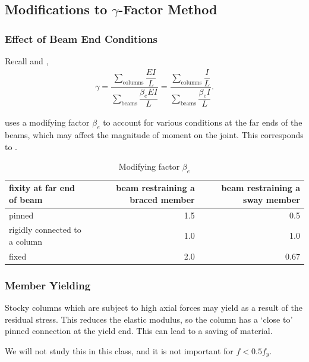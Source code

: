 \subsection{Modifications to \texorpdfstring{$\gamma$}{G}-Factor Method}
\subsubsection{Effect of Beam End Conditions}
Recall  and ,
\begin{gather*}
\gamma=\dfrac{\displaystyle\sum_{\text{columns}}\dfrac{EI}{L}}{\displaystyle\sum_{\text{beams}}\dfrac{\beta_eEI}{L}}=\dfrac{\displaystyle\sum_{\text{columns}}\dfrac{I}{L}}{\displaystyle\sum_{\text{beams}}\dfrac{\beta_eI}{L}}.
\end{gather*}

 uses a modifying factor $\beta_e$ to account for various conditions at the far ends of the beams, which may affect the magnitude of moment on the joint. This corresponds to .
\begin{table}[H]
\centering\footnotesize
\caption{Modifying factor $\beta_e$}\label{tab:beta_e}
\begin{tabular}{lrr}
	\toprule
	fixity at far end of beam     & beam restraining a braced member & beam restraining a sway member \\ \midrule
	pinned                        &                              1.5 &                            0.5 \\
	rigidly connected to a column &                              1.0 &                            1.0 \\
	fixed                         &                              2.0 &                           0.67 \\ \bottomrule
\end{tabular}
\end{table}
\begin{figure}[H]
\centering

\end{figure}
\subsubsection{Member Yielding}
Stocky columns which are subject to high axial forces may yield as a result of the residual stress. This reduces the elastic modulus, so the column has a `close to' pinned connection at the yield end. This can lead to a saving of material.

We will not study this in this class, and it is not important for $f<0.5f_y$.
